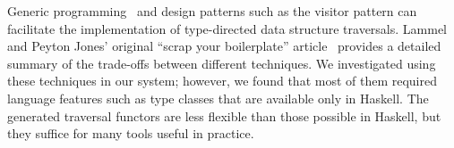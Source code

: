 Generic
programming~\cite{jeuring+:polytypic-programming,hinze+:generic-programming,lammel+:syb}
and design patterns such as the visitor pattern  can
facilitate the implementation of type-directed data structure
traversals.  Lammel and Peyton Jones' original ``scrap your
boilerplate'' article~\cite{lammel+:syb} provides a detailed summary
of the trade-offs between different techniques.  We investigated using
these techniques in our system; however, we found that most of them required
language features such as type classes that are available only in Haskell.
The generated \padsml{} traversal functors are less flexible
than those possible in Haskell, but they suffice for many tools useful in practice. 





  




